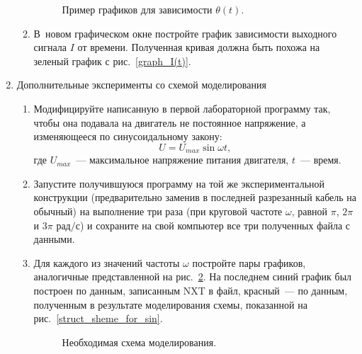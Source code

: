 \documentclass[12pt, a4paper, openany]{extarticle}
\begin{document}
\begin{enumerate}
\begin{enumerate}
\begin{figure}[h]
	\caption{Пример графиков для зависимости $\theta(t)$.}
	\label{second_graph}
\end{figure}
\item В~новом графическом окне постройте график зависимости выходного сигнала $I$ от времени. Полученная кривая должна быть похожа на зеленый график с рис.~\ref{graph_I(t)}.
\end{enumerate}
\item Дополнительные эксперименты со схемой моделирования
\begin{enumerate}
\item Модифицируйте написанную в первой лабораторной программу так, чтобы она подавала на двигатель не постоянное напряжение, а изменяющееся по синусоидальному закону:
\begin{equation}
	U = U_{max}\sin\omega t,
\end{equation}
где $U_{max}$~--- максимальное напряжение питания двигателя, $t$~--- время.
\item Запустите получившуюся программу на той же экспериментальной конструкции (предварительно заменив в последней разрезанный кабель на обычный) на выполнение три раза (при круговой частоте $\omega$, равной $\pi$, $2\pi$ и $3\pi\text{ рад/с}$) и сохраните на свой компьютер все три полученных файла с данными.
\item Для каждого из значений частоты $\omega$ постройте пары графиков, аналогичные представленной на рис.~\ref{graphs_when_sin}. На последнем синий график был построен по данным, записанным NXT в файл, красный~--- по данным, полученным в результате моделирования схемы, показанной на рис.~\ref{struct_sheme_for_sin}.
\begin{figure}[h]
	\caption{Необходимая схема моделирования.}
	\label{graphs_when_sin}
\end{figure}
\end{enumerate}
\end{enumerate}
\end{document}
